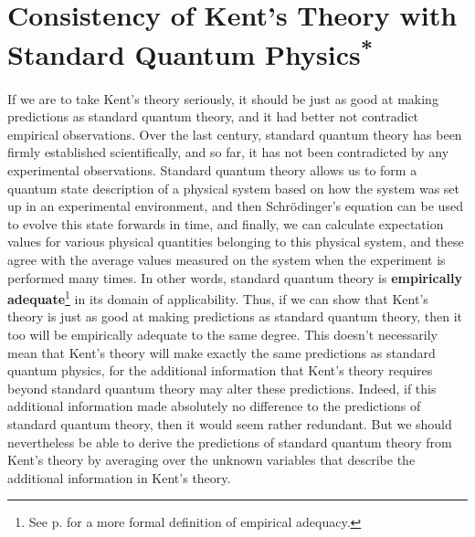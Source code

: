 \section{Consistency of Kent's Theory with Standard Quantum Physics\textsuperscript{*}\label{kentinterpretationconsistency}}
\renewcommand{\thefootnote}{\fnsymbol{footnote}}
\label{LorentzInvarianceSection}\renewcommand*{\thefootnote}{\arabic{footnote}}If we are to take Kent's theory seriously, it should be just as good at making predictions as standard quantum theory, and it had better not contradict empirical observations. Over the last century, standard quantum theory has been firmly established scientifically, and so far, it has not been contradicted by any experimental observations. Standard quantum theory allows us to form a quantum state description of a physical system based on how the system was set up in an experimental environment, and then Schr\"{o}dinger's equation can be used to evolve this state forwards in time, and finally, we can calculate expectation values for various physical quantities belonging to this physical system, and these agree with the average values measured on the system when the experiment is performed many times. In other words, standard quantum theory is \textbf{empirically adequate}\footnote{See p. \pageref{adeq} for a more formal definition of empirical adequacy.} in its domain of applicability. Thus, if we can show that Kent's theory is just as good at making predictions as standard quantum theory, then it too will be empirically adequate to the same degree. This doesn't necessarily mean that Kent's theory will make exactly the same predictions as standard quantum physics, for the additional information that Kent's theory requires beyond standard quantum theory may alter these predictions. Indeed, if this additional information made absolutely no difference to the predictions of standard quantum theory, then it would seem rather redundant. But we should nevertheless be able to derive the predictions of standard quantum theory from Kent's theory by averaging over the unknown variables that describe the additional information in Kent's theory. 

